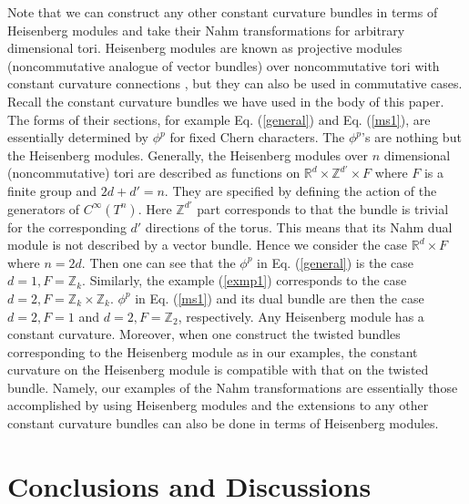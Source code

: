 \documentclass[a4paper,epsf,12pt]{article}
\newcommand{\R}{{\mathbb{R}}}
\newcommand{\Z}{{\mathbb{Z}}}
\begin{document}
Note that we can construct any other constant curvature bundles 
in terms of Heisenberg modules \cite{KoSc} 
and take their Nahm transformations for arbitrary dimensional tori. 
Heisenberg modules are known as projective modules 
(noncommutative analogue of vector bundles) over noncommutative tori
with constant curvature connections
\cite{KoSc}, but they can also be used in commutative cases. 
Recall the constant curvature bundles we have used in the body 
of this paper. 
The forms of their sections, 
for example Eq. (\ref{general}) and Eq. (\ref{ms1}), are 
essentially determined by $\phi^p$ for fixed Chern characters. 
The $\phi^p$'s are nothing but the Heisenberg modules. 
Generally,  
the Heisenberg modules over $n$ dimensional (noncommutative) tori 
are described as functions on $\R^d\times \Z^{d'}\times F$ where 
$F$ is a finite group and $2d+d'=n$. 
They are specified by defining the action of the generators of 
$C^\infty(T^n)$. 
Here $\Z^{d'}$ part corresponds to that the bundle is trivial 
for the corresponding $d'$ directions of the torus. 
This means that its Nahm dual module is 
not described by a vector bundle. 
Hence we consider the case 
$\R^d\times F$ where $n=2d$. 
Then one can see that the $\phi^p$ in Eq. (\ref{general}) is the case 
$d=1, F=\Z_k$. 
Similarly, the example (\ref{exmp1}) corresponds to the case 
$d=2, F=\Z_k\times\Z_k$. 
$\phi^p$ in Eq. (\ref{ms1}) and its dual bundle are then the case 
$d=2, F=1$ and $d=2, F=\Z_2$, respectively. 
Any Heisenberg module has a constant curvature. 
Moreover, when one construct the twisted bundles corresponding to the 
Heisenberg module as in our examples, 
the constant curvature on the Heisenberg module is compatible with 
that on the twisted bundle. 
Namely, our examples of the Nahm transformations are essentially 
those accomplished by using Heisenberg modules and 
the extensions to any other constant curvature bundles can also be 
done in terms of Heisenberg modules. 



\section{Conclusions and Discussions}
\end{document}

